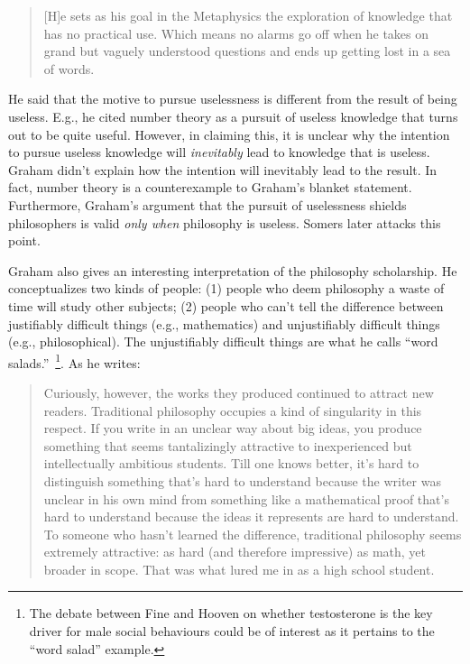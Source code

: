 \documentclass[12pt]{article}
\begin{document}
\begin{quotation}
 [H]e sets as his goal in the Metaphysics the exploration of knowledge that has no practical use. Which means no alarms go off when he takes on grand but vaguely understood questions and ends up getting lost in a sea of words.
\end{quotation}

He said that the motive to pursue uselessness is different from the result of being useless. E.g., he cited number theory as a pursuit of useless knowledge that turns out to be quite useful. However, in claiming this, it is unclear why the intention to pursue useless knowledge will \emph{inevitably} lead to knowledge that is useless. Graham didn't explain how the intention will inevitably lead to the result. In fact, number theory is a counterexample to Graham's blanket statement. Furthermore, Graham's argument that the pursuit of uselessness shields philosophers is valid \emph{only when} philosophy is useless. Somers later attacks this point.

Graham also gives an interesting interpretation of the philosophy scholarship. He conceptualizes two kinds of people: (1) people who deem philosophy a waste of time will study other subjects; (2) people who can't tell the difference between justifiably difficult things (e.g., mathematics) and unjustifiably difficult things (e.g., philosophical). The unjustifiably difficult things are what he calls \enquote{word salads.}~\footnote{The debate between Fine and Hooven on whether testosterone is the key driver for male social behaviours could be of interest as it pertains to the \enquote{word salad} example.

}. As he writes:

\begin{quotation}
 Curiously, however, the works they produced continued to attract new readers. Traditional philosophy occupies a kind of singularity in this respect. If you write in an unclear way about big ideas, you produce something that seems tantalizingly attractive to inexperienced but intellectually ambitious students. Till one knows better, it's hard to distinguish something that's hard to understand because the writer was unclear in his own mind from something like a mathematical proof that's hard to understand because the ideas it represents are hard to understand. To someone who hasn't learned the difference, traditional philosophy seems extremely attractive: as hard (and therefore impressive) as math, yet broader in scope. That was what lured me in as a high school student.
\end{quotation}
\end{document}
